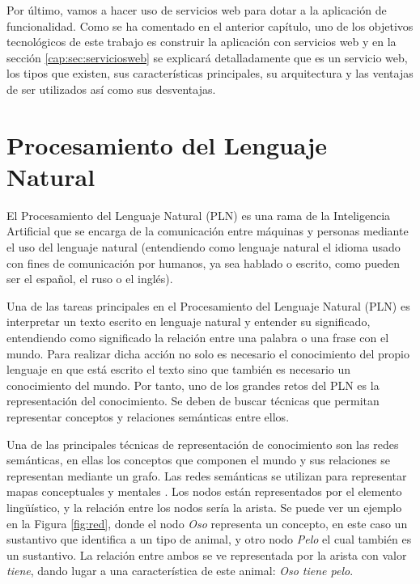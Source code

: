 Por último, vamos a hacer uso de servicios web para dotar a la aplicación de funcionalidad. Como se ha comentado en el anterior capítulo, uno de los objetivos tecnológicos de este trabajo es construir la aplicación con servicios web y en la sección \ref{cap:sec:serviciosweb} se explicará detalladamente que es un servicio web, los tipos que existen, sus características principales, su arquitectura y las ventajas de ser utilizados así como sus desventajas.


\section{Procesamiento del Lenguaje Natural}
\label{cap:sec:lenguajenatural}
El Procesamiento del Lenguaje Natural (PLN) es una rama de la Inteligencia Artificial que se encarga de la comunicación entre máquinas y personas mediante el uso del lenguaje natural (entendiendo como lenguaje natural el idioma usado con fines de comunicación por humanos, ya sea hablado o escrito, como pueden ser el español, el ruso o el inglés). 

Una de las tareas principales en el Procesamiento del Lenguaje Natural (PLN) es interpretar un texto escrito en lenguaje natural y entender su significado, entendiendo como significado la relación entre una palabra o una frase con el mundo. Para realizar dicha acción no solo es necesario el conocimiento del propio lenguaje en que está escrito el texto sino que también es necesario un conocimiento del mundo. Por tanto, uno de los grandes retos del PLN es la representación del conocimiento. Se deben de buscar técnicas que permitan representar conceptos y relaciones semánticas entre ellos. 

Una de las principales técnicas de representación de conocimiento son las redes semánticas, en ellas los conceptos que componen el mundo y sus relaciones se representan mediante un grafo. Las redes semánticas se utilizan para representar mapas conceptuales y mentales \citep{redSemantica2018}.
Los nodos están representados por el elemento lingüístico, y la relación entre los nodos sería la arista. Se puede ver un ejemplo en la Figura \ref{fig:red}, donde el nodo \textit{Oso} representa un concepto, en este caso un sustantivo que identifica a un tipo de animal, y otro nodo \textit{Pelo} el cual también es un sustantivo. La relación entre ambos se ve representada por la arista con valor \textit{tiene}, dando lugar a una característica de este animal: \textit{Oso tiene pelo}.

